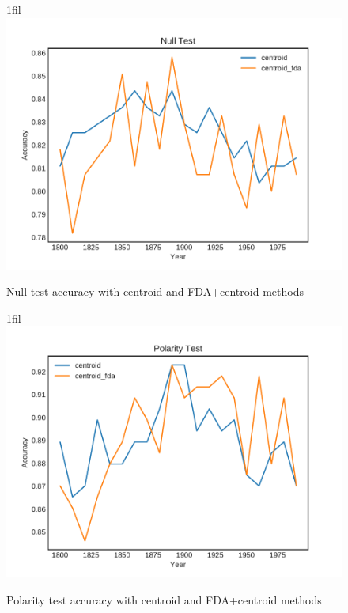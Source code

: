 \documentclass{article}
\makeatletter
\newcommand*{\centerfloat}{%
  \parindent \z@
  \leftskip \z@ \@plus 1fil \@minus \textwidth
  \rightskip\leftskip
  \parfillskip \z@skip}
\makeatother
\begin{document}
\begin{figure}[H]
    \centerfloat
    \includegraphics[width=1.5\linewidth]{centroid-fda-vs-not-fixed-seeds/results_null_test.pdf}
    \caption{Null test accuracy with centroid and FDA+centroid methods}
    \label{fig:fda-null}
\end{figure}

\begin{figure}[H]
    \centerfloat
    \includegraphics[width=1.5\linewidth]{centroid-fda-vs-not-fixed-seeds/results_polarity_test.pdf}
    \caption{Polarity test accuracy with centroid and FDA+centroid methods}
    \label{fig:fda-polarity}
\end{figure}
\end{document}
